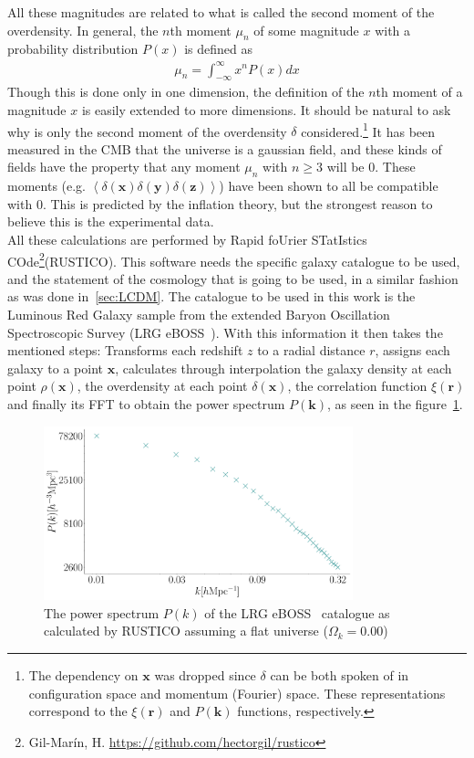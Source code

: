 All these magnitudes are related to what is called the second moment of the overdensity. In general, the $n$th moment $\mu_n$ of some magnitude $x$ with a probability distribution $P(x)$ is defined as 
\begin{align}
	\mu_n = \int_{-\infty}^{\infty} x^{n}P(x)dx 
	\label{eq:n-moment}
\end{align}
Though this is done only in one dimension, the definition of the $n$th moment of a magnitude $x$ is easily extended to more dimensions.
It should be natural to ask why is only the second moment of the overdensity $\delta$ considered.\footnote{The dependency on $\textbf{x}$ was dropped since $\delta$ can be both spoken of in configuration space and momentum (Fourier) space. These representations correspond to the $\xi(\textbf{r})$ and $P(\textbf{k})$ functions, respectively.}
It has been measured in the CMB that the universe is a gaussian field, and these kinds of fields have the property that any moment $\mu_n$ with $n\ge3$ will be 0. These moments (e.g. $ \left<\delta(\textbf{x}) \delta(\textbf{y}) \delta(\textbf{z}) \right>$) have been shown to all be compatible with 0. This is predicted by the inflation theory, but the strongest reason to believe this is the experimental data. \\

All these calculations are performed by Rapid foUrier STatIstics COde\footnote{Gil-Marín, H. \url{https://github.com/hectorgil/rustico}}(RUSTICO). This software needs the specific galaxy catalogue to be used, and the statement of the cosmology that is going to be used, in a similar fashion as was done in~\ref{sec:LCDM}. The catalogue to be used in this work is the Luminous Red Galaxy sample from the extended Baryon Oscillation Spectroscopic Survey (LRG eBOSS~\cite{eBoss}).
With this information it then takes the mentioned steps: Transforms each redshift $z$ to a radial distance $r$, assigns each galaxy to a point $\textbf{x}$, calculates through interpolation the galaxy density at each point $\rho\left(  \textbf{x}\right)$, the overdensity at each point $\delta\left( \textbf{x} \right)$, the correlation function $\xi(\textbf{r})$ and finally its FFT to obtain the power spectrum $P(\textbf{k})$, as seen in the figure~\ref{fig:rustico}. \\


\begin{figure}[t]
	\centering
	\includegraphics[width=0.8\textwidth]{../figs/Pkrustico.pdf}
	\caption{The power spectrum $P(k)$ of the LRG eBOSS~\cite{eBoss} catalogue as calculated by RUSTICO assuming a flat universe ($\Omega_k = 0.00$)}
	\label{fig:rustico}
\end{figure}


